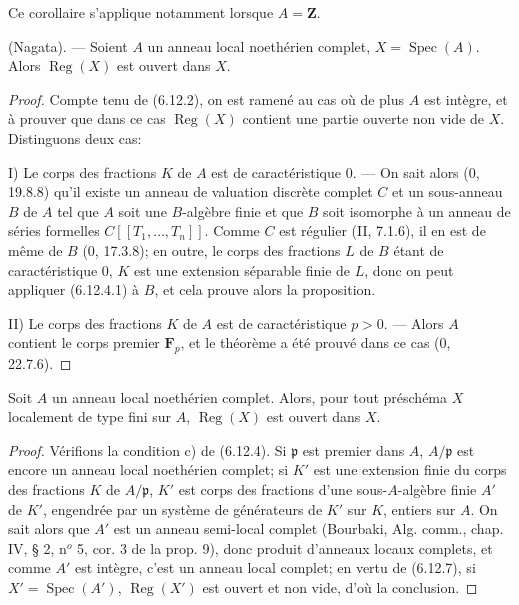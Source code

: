 Ce corollaire s'applique notamment lorsque $A=\mathbf Z$.

\begin{theorem}[6.12.7]
\label{IV.2.s6.12.7-fr}
\textnormal{(Nagata).} --- Soient $A$ un anneau local noethérien complet,
$X=\operatorname{Spec}(A)$. Alors $\operatorname{Reg}(X)$ est ouvert dans
$X$.
\end{theorem}

\begin{proof}
Compte tenu de (6.12.2), on est ramené au cas où de plus $A$ est intègre, et
à prouver que dans ce cas $\operatorname{Reg}(X)$ contient une partie
ouverte non vide de $X$. Distinguons deux cas:

I) Le corps des fractions $K$ de $A$ est de caractéristique 0. --- On sait
alors (0, 19.8.8) qu'il existe un anneau de valuation discrète complet $C$
et un sous-anneau $B$ de $A$ tel que $A$ soit une $B$-algèbre finie et que
$B$ soit isomorphe à un anneau de séries formelles
$C[[T_1,\ldots,T_n]]$. Comme $C$ est régulier (II, 7.1.6), il en est de
même de $B$ (0, 17.3.8); en outre, le corps des fractions $L$ de $B$ étant
de caractéristique 0, $K$ est une extension séparable finie de $L$, donc on
peut appliquer (6.12.4.1) à $B$, et cela prouve alors la proposition.

II) Le corps des fractions $K$ de $A$ est de caractéristique $p>0$. ---
Alors $A$ contient le corps premier $\mathbf F_p$, et le théorème a été
prouvé dans ce cas (0, 22.7.6).
\end{proof}

\begin{corollary}[6.12.8]
\label{IV.2.s6.12.8-fr}
Soit $A$ un anneau local noethérien complet. Alors, pour tout préschéma $X$
localement de type fini sur $A$, $\operatorname{Reg}(X)$ est ouvert dans
$X$.
\end{corollary}

\begin{proof}
Vérifions la condition c) de (6.12.4). Si $\mathfrak p$ est premier dans
$A$, $A/\mathfrak p$ est encore un anneau local noethérien complet; si $K'$
est une extension finie du corps des fractions $K$ de $A/\mathfrak p$, $K'$
est corps des fractions d'une sous-$A$-algèbre finie $A'$ de $K'$, engendrée
par un système de générateurs de $K'$ sur $K$, entiers sur $A$. On sait
alors que $A'$ est un anneau semi-local complet (Bourbaki, Alg. comm.,
chap. IV, § 2, n$^o$ 5, cor. 3 de la prop. 9), donc produit d'anneaux locaux
complets, et comme $A'$ est intègre, c'est un anneau local complet; en vertu
de (6.12.7), si $X'=\operatorname{Spec}(A')$,
$\operatorname{Reg}(X')$ est ouvert et non vide, d'où la conclusion.
\end{proof}

